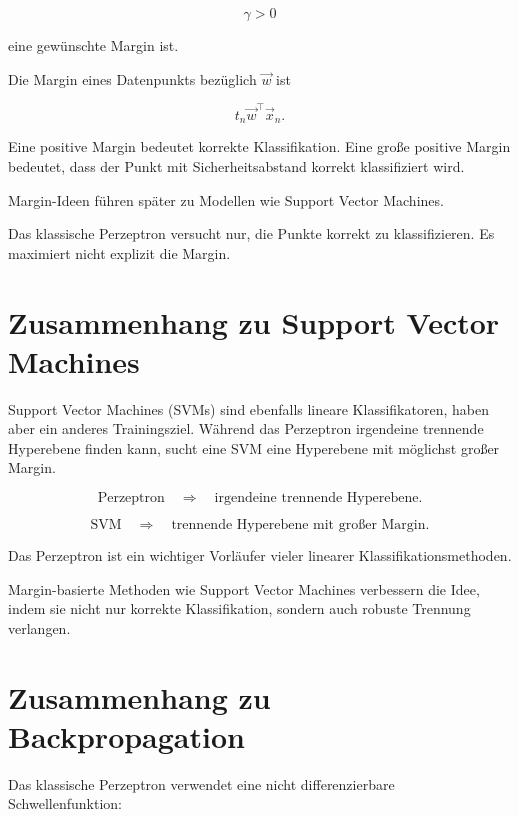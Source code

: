 \[
    \gamma>0
\]

eine gewünschte Margin ist.

\begin{definitionbox}
Die Margin eines Datenpunkts bezüglich \(\vec{w}\) ist

\[
    t_n\vec{w}^{\top}\vec{x}_n.
\]

Eine positive Margin bedeutet korrekte Klassifikation.
Eine große positive Margin bedeutet, dass der Punkt mit Sicherheitsabstand korrekt klassifiziert wird.
\end{definitionbox}

Margin-Ideen führen später zu Modellen wie Support Vector Machines.

\begin{notebox}
Das klassische Perzeptron versucht nur, die Punkte korrekt zu klassifizieren.
Es maximiert nicht explizit die Margin.
\end{notebox}

\section{Zusammenhang zu Support Vector Machines}

Support Vector Machines (SVMs) sind ebenfalls lineare Klassifikatoren, haben aber ein anderes Trainingsziel.
Während das Perzeptron irgendeine trennende Hyperebene finden kann, sucht eine SVM eine Hyperebene mit möglichst großer Margin.

\[
    \text{Perzeptron}
    \quad
    \Rightarrow
    \quad
    \text{irgendeine trennende Hyperebene}.
\]

\[
    \text{SVM}
    \quad
    \Rightarrow
    \quad
    \text{trennende Hyperebene mit großer Margin}.
\]

\begin{conceptbox}
Das Perzeptron ist ein wichtiger Vorläufer vieler linearer Klassifikationsmethoden.

Margin-basierte Methoden wie Support Vector Machines verbessern die Idee, indem sie nicht nur korrekte Klassifikation, sondern auch robuste Trennung verlangen.
\end{conceptbox}

\section{Zusammenhang zu Backpropagation}

Das klassische Perzeptron verwendet eine nicht differenzierbare Schwellenfunktion:

